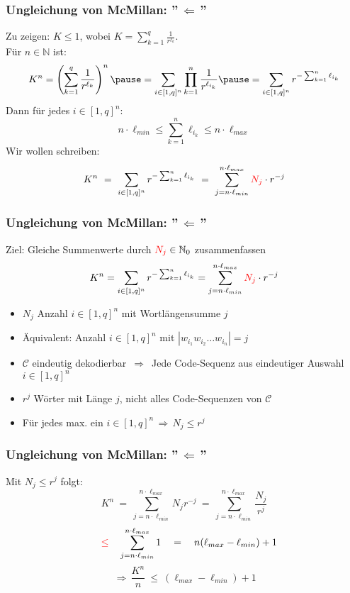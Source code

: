 \documentclass{beamer}
\begin{document}
\begin{frame}[t]
    \frametitle{Ungleichung von McMillan: ''$\,\Longleftarrow\,$''}
        Zu zeigen: $K \leq 1$, wobei
        $\displaystyle
            K = \sum_{k=1}^{q} \frac{1}{r^{\ell_k}}
        $.\\
        \pause
        Für $n \in \mathbb{N}$ ist:
        $$
            K^n = \left(\sum_{k=1}^{q} \frac{1}{r^{\ell_k}}\right)^n
            \pause
            = \sum_{i \in [1,q]^n} \prod_{k=1}^{n} \frac{1}{r^{\ell_{i_k}}}
            \pause
            = \sum_{i\in [1,q]^n} r^{-\sum_{k=1}^{n} \ell_{i_k}}
        $$\pause
        Dann für jedes $i \in [1,q]^n:$
        $$
            n\cdot \ell_{min} \leq \sum_{k=1}^{n} \ell_{i_k} \leq n\cdot \ell_{max}
        $$
        \pause
        Wir wollen schreiben:
        $$
            K^n
            \ =\ \sum_{i\in [1,q]^n} r^{-\sum_{k=1}^{n} \ell_{i_k}}
            \ =\ \sum_{j=n\cdot \ell_{min}}^{n\cdot \ell_{max}} {\color{red}N_j}\cdot r^{-j}
        $$
\end{frame}

\begin{frame}[t]
    \frametitle{Ungleichung von McMillan: ''$\,\Longleftarrow\,$''}
    Ziel: Gleiche Summenwerte durch ${\color{red}N_j} \in \mathbb{N}_0$ zusammenfassen
    $$
        K^n = \sum_{i\in [1,q]^n} r^{-\sum_{k=1}^{n} \ell_{i_k}}
        = \sum_{j=n\cdot\ell_{min}}^{n\cdot\ell_{max}} {\color{red}N_j} \cdot r^{-j}
    $$
    \pause

    \begin{itemize}
        \setlength\itemsep{1em}
        \item $N_j$ Anzahl $i \in [1,q]^n$ mit Wortlängensumme $j$
        \pause
        \item Äquivalent: Anzahl $i \in [1,q]^n$ mit $|w_{i_1}w_{i_2}\dots w_{i_n}| = j$
        \pause
        \item $\mathcal{C}$ eindeutig dekodierbar
            $\,\Longrightarrow\,$ Jede Code-Sequenz aus eindeutiger Auswahl
                $i \in [1,q]^n$
        \pause
    \item $r^j$ Wörter mit Länge $j$, nicht alles Code-Sequenzen von $\mathcal{C}$
    \item Für jedes max. ein $i \in [1,q]^n \,\Longrightarrow\, N_j \leq r^j$
    \end{itemize}

\end{frame}

\begin{frame}[t]
    \frametitle{Ungleichung von McMillan: ''$\,\Longleftarrow\,$''}
        Mit {$N_j \leq r^j$} folgt:
        $$
            K^n
            \ =\ \sum_{j = n\cdot \ell_{min}}^{n\cdot \ell_{max}} N_jr^{-j}
            \ =\ \sum_{j = n\cdot\ell_{min}}^{n\cdot\ell_{max}} \frac{N_j}{r^j}
        $$
        \pause
        $$
            \quad{\color{red}\leq}\quad \sum_{j = n\cdot\ell_{min}}^{n\cdot\ell_{max}} 1
            \quad=\quad n(\ell_{max}-\ell_{min}) + 1
        $$
        \pause
        $$
            \,\Longrightarrow\, \frac{K^n}{n}\ \leq\ (\ell_{max}-\ell_{min}) + 1
        $$
\end{frame}
\end{document}
